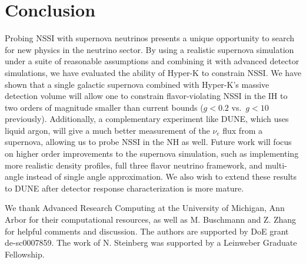 \documentclass[a4paper,12pt]{article}
\begin{document}
\section{Conclusion}
Probing NSSI with supernova neutrinos presents a unique opportunity to search for new physics in the neutrino sector. By using a realistic supernova simulation under a suite of reasonable assumptions and combining it with advanced detector simulations, we have evaluated the ability of Hyper-K to constrain NSSI. We have shown that a single galactic supernova combined with Hyper-K's massive detection volume will allow one to constrain flavor-violating NSSI in the IH to two orders of magnitude smaller than current bounds ($g < 0.2$ vs.\ $g < 10$ previously). Additionally, a complementary experiment like DUNE, which uses liquid argon, will give a much better measurement of the $\nu_{e}$ flux from a supernova, allowing us to probe NSSI in the NH as well. Future work will focus on higher order improvements to the supernova simulation, such as implementing more realistic density profiles, full three flavor neutrino framework, and multi-angle instead of single angle approximation. We also wish to extend these results to DUNE after detector response characterization is more mature. 

\acknowledgments

We thank Advanced Research Computing at the University of Michigan, Ann Arbor for their computational resources, as well as M. Buschmann and Z. Zhang for helpful comments and discussion. The authors are supported by DoE grant de-sc0007859. The work of N. Steinberg was supported by a Leinweber Graduate Fellowship. 



\end{document}
